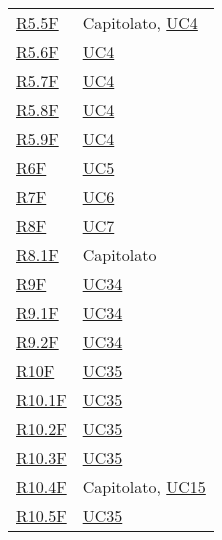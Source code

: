 \begin{center}
\begin{longtable}[!h]{p{50px} p{50px}}
        \hyperref[tab:RequisitiFunzionali]{R5.5F}  & Capitolato, \newline \hyperref[sec:UC4]{UC4}   \\
        \hyperref[tab:RequisitiFunzionali]{R5.6F}  & \hyperref[sec:UC4]{UC4}                        \\
        \hyperref[tab:RequisitiFunzionali]{R5.7F}  & \hyperref[sec:UC4]{UC4}                        \\
        \hyperref[tab:RequisitiFunzionali]{R5.8F}  & \hyperref[sec:UC4]{UC4}                        \\
        \hyperref[tab:RequisitiFunzionali]{R5.9F}  & \hyperref[sec:UC4]{UC4}                        \\
        \hyperref[tab:RequisitiFunzionali]{R6F}    & \hyperref[sec:UC5]{UC5}                        \\
        \hyperref[tab:RequisitiFunzionali]{R7F}    & \hyperref[sec:UC6]{UC6}                        \\
        \hyperref[tab:RequisitiFunzionali]{R8F}    & \hyperref[sec:UC7]{UC7}                        \\
        \hyperref[tab:RequisitiFunzionali]{R8.1F}  & Capitolato                                     \\
        \hyperref[tab:RequisitiFunzionali]{R9F}    & \hyperref[sec:UC34]{UC34}                      \\
        \hyperref[tab:RequisitiFunzionali]{R9.1F}  & \hyperref[sec:UC34]{UC34}                      \\
        \hyperref[tab:RequisitiFunzionali]{R9.2F}  & \hyperref[sec:UC34]{UC34}                      \\
        \hyperref[tab:RequisitiFunzionali]{R10F}   & \hyperref[sec:UC35]{UC35}                      \\
        \hyperref[tab:RequisitiFunzionali]{R10.1F} & \hyperref[sec:UC35]{UC35}                      \\
        \hyperref[tab:RequisitiFunzionali]{R10.2F} & \hyperref[sec:UC35]{UC35}                      \\
        \hyperref[tab:RequisitiFunzionali]{R10.3F} & \hyperref[sec:UC35]{UC35}                      \\
        \hyperref[tab:RequisitiFunzionali]{R10.4F} & Capitolato, \newline \hyperref[sec:UC15]{UC15} \\
        \hyperref[tab:RequisitiFunzionali]{R10.5F} & \hyperref[sec:UC35]{UC35}                      \\

\end{longtable}
\end{center}
